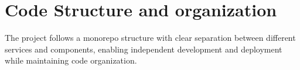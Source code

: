 





\section{Code Structure and organization}

The project follows a monorepo structure with clear separation between different 
services and components, enabling independent development and deployment while 
maintaining code organization.

